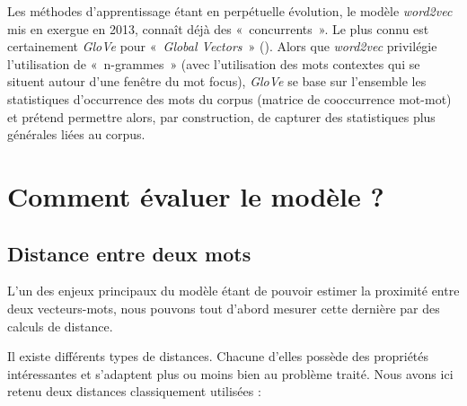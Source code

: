 \documentclass[11pt,french,french]{article}
\begin{document}
Les méthodes d'apprentissage étant en perpétuelle évolution, le modèle
\emph{word2vec} mis en exergue en 2013, connaît déjà des
«~concurrents~». Le plus connu est certainement \emph{GloVe} pour
«~\emph{Global Vectors}~» (\cite{Pennington}). Alors que \emph{word2vec}
privilégie l'utilisation de «~n-grammes~» (avec l'utilisation des mots
contextes qui se situent autour d'une fenêtre du mot focus),
\emph{GloVe} se base sur l'ensemble les statistiques d'occurrence des
mots du corpus (matrice de cooccurrence mot-mot) et prétend permettre
alors, par construction, de capturer des statistiques plus générales
liées au corpus.

\newpage

\appendix



\section{Comment évaluer le modèle ?}\label{annexe:commentEvaluer}

\subsection{Distance entre deux mots}\label{distance-entre-deux-mots}

L'un des enjeux principaux du modèle étant de pouvoir estimer la
proximité entre deux vecteurs-mots, nous pouvons tout d'abord mesurer
cette dernière par des calculs de distance.

Il existe différents types de distances. Chacune d'elles possède des
propriétés intéressantes et s'adaptent plus ou moins bien au problème
traité. Nous avons ici retenu deux distances classiquement utilisées :
\end{document}
